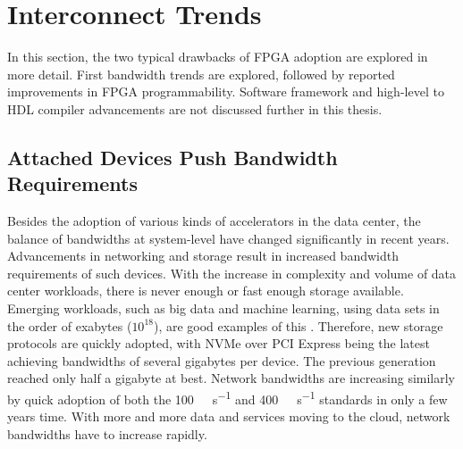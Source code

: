




\section{Interconnect Trends}
In this section, the two typical drawbacks of FPGA adoption are explored in more detail. First bandwidth trends are explored, followed by reported improvements in FPGA programmability. Software framework and high-level to HDL compiler advancements are not discussed further in this thesis.



\subsection{Attached Devices Push Bandwidth Requirements}


Besides the adoption of various kinds of accelerators in the data center, the balance of bandwidths at system-level have changed significantly in recent years. Advancements in networking and storage result in increased bandwidth requirements of such devices. With the increase in complexity and volume of data center workloads, there is never enough or fast enough storage available. 
Emerging workloads, such as big data and machine learning, using data sets in the order of exabytes ($10^{18}$), are good examples of this \cite{teradata}.
Therefore, new storage protocols are quickly adopted, with NVMe over PCI Express being the latest achieving bandwidths of several gigabytes per device. The previous generation reached only half a gigabyte at best. Network bandwidths are increasing similarly by quick adoption of both the \SI{100}{\giga\bit\per\second} and \SI{400}{\giga\bit\per\second} standards in only a few years time. With more and more data and services moving to the cloud, network bandwidths have to increase rapidly.



